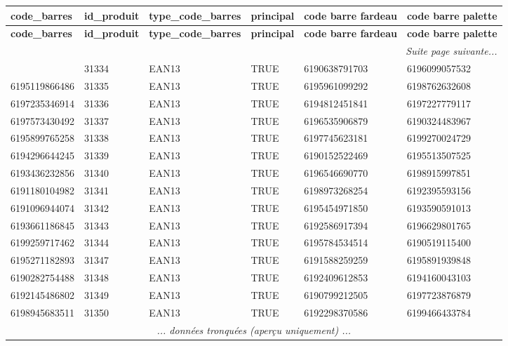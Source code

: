 \documentclass[a4paper,11pt]{article}
\begin{document}
\scriptsize
\begin{longtable}{|l|l|l|l|l|l|}
\hline
\rowcolor{headerblue}
\textbf{code\_barres} & \textbf{id\_produit} & \textbf{type\_code\_barres} & \textbf{principal} & \textbf{code barre fardeau} & \textbf{code barre palette} \\ \hline
\endfirsthead
\hline
\rowcolor{headerblue}
\textbf{code\_barres} & \textbf{id\_produit} & \textbf{type\_code\_barres} & \textbf{principal} & \textbf{code barre fardeau} & \textbf{code barre palette} \\ \hline
\endhead
\hline \multicolumn{6}{|r|}{\textit{Suite page suivante...}} \\ \hline
\endfoot
\hline
\endlastfoot
 6199447549400 & 31334 & EAN13 & TRUE & 6190638791703 & 6196099057532 \\ \hline
\rowcolor{rowgray} 6195119866486 & 31335 & EAN13 & TRUE & 6195961099292 & 6198762632608 \\ \hline
 6197235346914 & 31336 & EAN13 & TRUE & 6194812451841 & 6197227779117 \\ \hline
\rowcolor{rowgray} 6197573430492 & 31337 & EAN13 & TRUE & 6196535906879 & 6190324483967 \\ \hline
 6195899765258 & 31338 & EAN13 & TRUE & 6197745623181 & 6199270024729 \\ \hline
\rowcolor{rowgray} 6194296644245 & 31339 & EAN13 & TRUE & 6190152522469 & 6195513507525 \\ \hline
 6193436232856 & 31340 & EAN13 & TRUE & 6196546690770 & 6198915997851 \\ \hline
\rowcolor{rowgray} 6191180104982 & 31341 & EAN13 & TRUE & 6198973268254 & 6192395593156 \\ \hline
 6191096944074 & 31342 & EAN13 & TRUE & 6195454971850 & 6193590591013 \\ \hline
\rowcolor{rowgray} 6193661186845 & 31343 & EAN13 & TRUE & 6192586917394 & 6196629801765 \\ \hline
 6199259717462 & 31344 & EAN13 & TRUE & 6195784534514 & 6190519115400 \\ \hline
\rowcolor{rowgray} 6195271182893 & 31347 & EAN13 & TRUE & 6191588259259 & 6195891939848 \\ \hline
 6190282754488 & 31348 & EAN13 & TRUE & 6192409612853 & 6194160043103 \\ \hline
\rowcolor{rowgray} 6192145486802 & 31349 & EAN13 & TRUE & 6190799212505 & 6197723876879 \\ \hline
 6198945683511 & 31350 & EAN13 & TRUE & 6192298370586 & 6199466433784 \\ \hline
\multicolumn{6}{|c|}{\textit{... données tronquées (aperçu uniquement) ...}} \\ \hline
\end{longtable}
\normalsize
\end{document}
